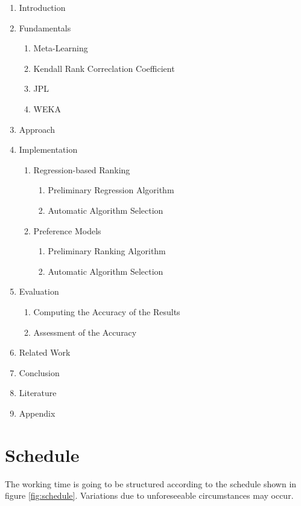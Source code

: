 \documentclass[12pt]{scrartcl}
\begin{document}
\begin{enumerate}
	\item Introduction
	\item Fundamentals
	\begin{enumerate}
		\item Meta-Learning
		\item Kendall Rank Correclation Coefficient
		\item JPL
		\item WEKA
	\end{enumerate}
	\item Approach
	\item Implementation
	\begin{enumerate} 
		\item Regression-based Ranking
		\begin{enumerate}
			\item Preliminary Regression Algorithm
			\item Automatic Algorithm Selection
		\end{enumerate}
		\item Preference Models
		\begin{enumerate}
			\item Preliminary Ranking Algorithm
			\item Automatic Algorithm Selection
		\end{enumerate}
	\end{enumerate}
	\item Evaluation
	\begin{enumerate}
		\item Computing the Accuracy of the Results
		\item Assessment of the Accuracy
	\end{enumerate}
	\item Related Work
	\item Conclusion
	\item Literature
	\item Appendix
\end{enumerate}


\newpage
\section{Schedule}\label{sec:schedule}
The working time is going to be structured according to the schedule shown in figure \ref{fig:schedule}. Variations due to unforeseeable circumstances may occur.
\end{document}
